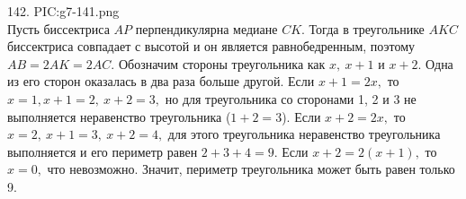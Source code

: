 142. {{PIC:g7-141.png}}\\
Пусть биссектриса $AP$ перпендикулярна медиане $CK.$ Тогда в треугольнике $AKC$ биссектриса совпадает с высотой и он является равнобедренным, поэтому $AB=2AK=2AC.$ Обозначим стороны треугольника как $x,\ x+1$ и $x+2.$ Одна из его сторон оказалась в два раза больше другой. Если $x+1=2x,$ то $x=1, x+1=2,\ x+2=3,$ но для треугольника со сторонами 1, 2 и 3 не выполняется неравенство треугольника ($1+2=3$). Если $x+2=2x,$ то $x=2,\ x+1=3,\ x+2=4,$ для этого треугольника неравенство треугольника выполняется и его периметр равен $2+3+4=9.$ Если $x+2=2(x+1),$ то $x=0,$ что невозможно. Значит, периметр треугольника может быть равен только 9.\newpage\noindent
